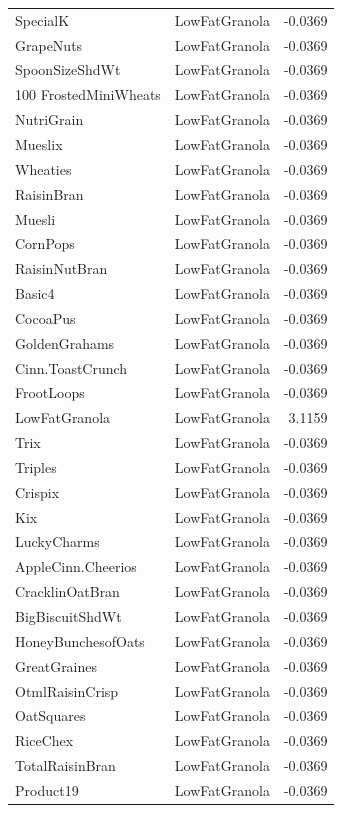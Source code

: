 \begin{longtable}{llr}
SpecialK & LowFatGranola & -0.0369 \\
GrapeNuts & LowFatGranola & -0.0369 \\
SpoonSizeShdWt & LowFatGranola & -0.0369 \\
100%
FrostedMiniWheats & LowFatGranola & -0.0369 \\
NutriGrain & LowFatGranola & -0.0369 \\
Mueslix & LowFatGranola & -0.0369 \\
Wheaties & LowFatGranola & -0.0369 \\
RaisinBran & LowFatGranola & -0.0369 \\
Muesli & LowFatGranola & -0.0369 \\
CornPops & LowFatGranola & -0.0369 \\
RaisinNutBran & LowFatGranola & -0.0369 \\
Basic4 & LowFatGranola & -0.0369 \\
CocoaPus & LowFatGranola & -0.0369 \\
GoldenGrahams & LowFatGranola & -0.0369 \\
Cinn.ToastCrunch & LowFatGranola & -0.0369 \\
FrootLoops & LowFatGranola & -0.0369 \\
LowFatGranola & LowFatGranola & 3.1159 \\
Trix & LowFatGranola & -0.0369 \\
Triples & LowFatGranola & -0.0369 \\
Crispix & LowFatGranola & -0.0369 \\
Kix & LowFatGranola & -0.0369 \\
LuckyCharms & LowFatGranola & -0.0369 \\
AppleCinn.Cheerios & LowFatGranola & -0.0369 \\
CracklinOatBran & LowFatGranola & -0.0369 \\
BigBiscuitShdWt & LowFatGranola & -0.0369 \\
HoneyBunchesofOats & LowFatGranola & -0.0369 \\
GreatGraines & LowFatGranola & -0.0369 \\
OtmlRaisinCrisp & LowFatGranola & -0.0369 \\
OatSquares & LowFatGranola & -0.0369 \\
RiceChex & LowFatGranola & -0.0369 \\
TotalRaisinBran & LowFatGranola & -0.0369 \\
Product19 & LowFatGranola & -0.0369 \\

\end{longtable}
